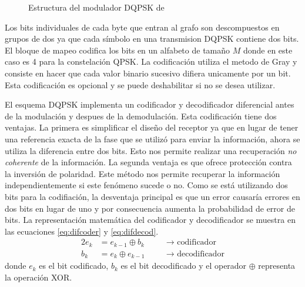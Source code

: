 \begin{figure}[bp]
  \centering
  \vspace{0.5in}
  \vspace{0.3in}
  \caption{Estructura del modulador DQPSK de \gnuradio}
  \label{fig:dqpsk}
\end{figure}

Los bits individuales de cada byte que entran al grafo son descompuestos en grupos de dos ya
que cada s\'imbolo en una transmision DQPSK contiene dos bits. El bloque de mapeo codifica los bits
en un alfabeto de tama\~no $M$ donde en este caso es 4 para la constelaci\'on QPSK. La
codificaci\'on utiliza el metodo de Gray y consiste en hacer que cada valor binario sucesivo difiera
unicamente por un bit. Esta codificaci\'on es opcional y se puede deshabilitar si no se desea utilizar. 

El esquema DQPSK implementa un codificador y decodificador diferencial antes de la modulaci\'on y
despues de la demodulaci\'on. Esta codificaci\'on tiene dos ventajas. La primera es simplificar el
dise\~no del receptor ya que en lugar de tener una referencia exacta de la fase que se utiliz\'o
para enviar la informaci\'on, ahora se utiliza la diferencia entre dos bits. Esto nos
permite realizar una recuperaci\'on \emph{no coherente} de la informaci\'on. La segunda ventaja es que
ofrece protecci\'on contra la inversi\'on de polaridad. Este m\'etodo nos permite recuperar la
informaci\'on independientemente si este fen\'omeno sucede o no. Como se est\'a utilizando dos bits
para la codifiaci\'on, la desventaja principal es que un error causar\'ia errores en dos bits en
lugar de uno y por consecuencia aumenta la probabilidad de error de bits. La representaci\'on
matem\'atica del codificador y decodificador se muestra en las ecuaciones \eqref{eq:difcoder} y
\eqref{eq:difdecod}.
\begin{alignat}{2}
e_k &=e_{k-1}\oplus b_k &\quad &\rightarrow \text{ codificador}\label{eq:difcoder}\\
b_k &=e_k \oplus e_{k-1} &\quad &\rightarrow \text{ decodificador}\label{eq:difdecod}
\end{alignat}
donde $e_k$ es el bit codificado, $b_k$ es el bit decodificado y el operador $\oplus$ representa la
operaci\'on XOR.

